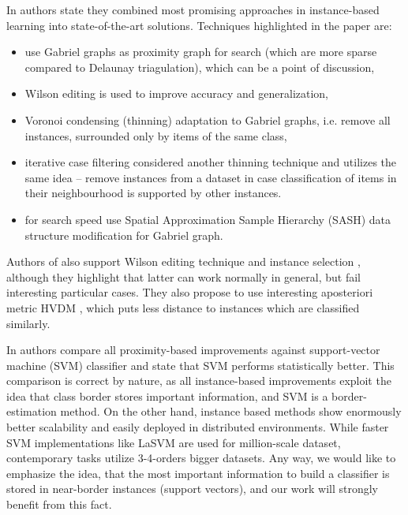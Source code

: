 In \cite{BhattacharyaGeometricPaper} authors state they combined most promising approaches in instance-based learning into state-of-the-art solutions. Techniques highlighted in the paper are:
\begin{itemize}
    \item use Gabriel graphs as proximity graph for search (which are more sparse compared to Delaunay triagulation), which can be a point of discussion,
    \item Wilson editing \cite{Wilson} is used to improve accuracy and generalization,
    \item Voronoi condensing (thinning) adaptation to Gabriel graphs, i.e. remove all instances, surrounded only by items of the same class,
    \item iterative case filtering \cite{IterativeCaseFiltering} considered another thinning technique and utilizes the same idea -- remove instances from a dataset in case classification of items in their neighbourhood is supported by other instances.
    \item for search speed use Spatial Approximation Sample Hierarchy (SASH) data structure modification for Gabriel graph.
\end{itemize}

Authors of \cite{ProximityGraphSurvey} also support Wilson editing \cite{Wilson} technique and instance selection \cite{InstanceSelection}, although they highlight that latter can work normally in general, but fail interesting particular cases. They also propose to use interesting aposteriori metric HVDM \cite{HVDM}, which puts less distance to instances which are classified similarly.

In \cite{ProximityGraphSurvey} authors compare all proximity-based improvements against support-vector machine (SVM) classifier and state that SVM performs statistically better. This comparison is correct by nature, as all instance-based improvements exploit the idea that class border stores important information, and SVM is a border-estimation method.
On the other hand, instance based methods show enormously better scalability and easily deployed in distributed environments. While faster SVM implementations like LaSVM \cite{LaSVM} are used for million-scale dataset, contemporary tasks utilize 3-4-orders bigger datasets. Any way, we would like to emphasize the idea, that the most important information to build a classifier is stored in near-border instances (support vectors), and our work will strongly benefit from this fact.

